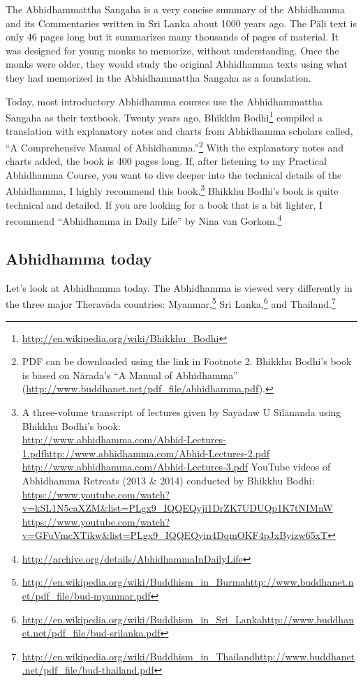 The Abhidhammattha Sangaha is a very concise summary of the Abhidhamma and its Commentaries written in Sri Lanka about 1000 years ago. The Pāḷi text is only 46 pages long but it summarizes many thousands of pages of material. It was designed for young monks to memorize, without understanding. Once the monks were older, they would study the original Abhidhamma texts using what they had memorized in the Abhidhammattha Sangaha as a foundation. 

\pagebreak

Today, most introductory Abhidhamma courses use the Abhidhammattha Sangaha as their textbook. Twenty years ago, Bhikkhu Bodhi\footnote{\url{http://en.wikipedia.org/wiki/Bhikkhu_Bodhi}} compiled a translation with explanatory notes and charts from Abhidhamma scholars called, “A Comprehensive Manual of Abhidhamma.”\footnote{PDF can be downloaded using the link in Footnote 2. Bhikkhu Bodhi's book is based on Nārada's “A Manual of Abhidhamma” (\url{http://www.buddhanet.net/pdf_file/abhidhamma.pdf}).} With the explanatory notes and charts added, the book is 400 pages long. If, after listening to my Practical Abhidhamma Course, you want to dive deeper into the technical details of the Abhidhamma, I highly recommend this book.\footnote{A three-volume transcript of lectures given by Sayādaw U Sīlānanda using Bhikkhu Bodhi’s book:\\ \url{http://www.abhidhamma.com/Abhid-Lectures-1.pdf}\linebreak \url{http://www.abhidhamma.com/Abhid-Lectures-2.pdf} \linebreak \url{http://www.abhidhamma.com/Abhid-Lectures-3.pdf}\linebreak
YouTube videos of Abhidhamma Retreats (2013 \& 2014) conducted by Bhikkhu Bodhi:\\
\url{https://www.youtube.com/watch?v=kSL1N5caXZM&list=PLgx9_IQQEQyji1DrZK7UDUQp1K7tNIMnW}
\url{https://www.youtube.com/watch?v=GFuVmcXTikw&list=PLgx9_IQQEQyin4DqmOKF4pJxByizw65xT}} Bhikkhu Bodhi’s book is quite technical and detailed. If you are looking for a book that is a bit lighter, I recommend “Abhidhamma in Daily Life” by Nina van Gorkom.\footnote{\url{http://archive.org/details/AbhidhammaInDailyLife}}

\subsection*{Abhidhamma today}

Let’s look at Abhidhamma today. The Abhidhamma is viewed very differently in the three major Theravāda countries: Myanmar,\footnote{\url{http://en.wikipedia.org/wiki/Buddhism_in_Burma}\linebreak\url{http://www.buddhanet.net/pdf_file/bud-myanmar.pdf}} Sri Lanka,\footnote{\url{http://en.wikipedia.org/wiki/Buddhism_in_Sri_Lanka}\linebreak\url{http://www.buddhanet.net/pdf_file/bud-srilanka.pdf}} and Thailand.\footnote{\url{http://en.wikipedia.org/wiki/Buddhism_in_Thailand}\linebreak\url{http://www.buddhanet.net/pdf_file/bud-thailand.pdf}}

